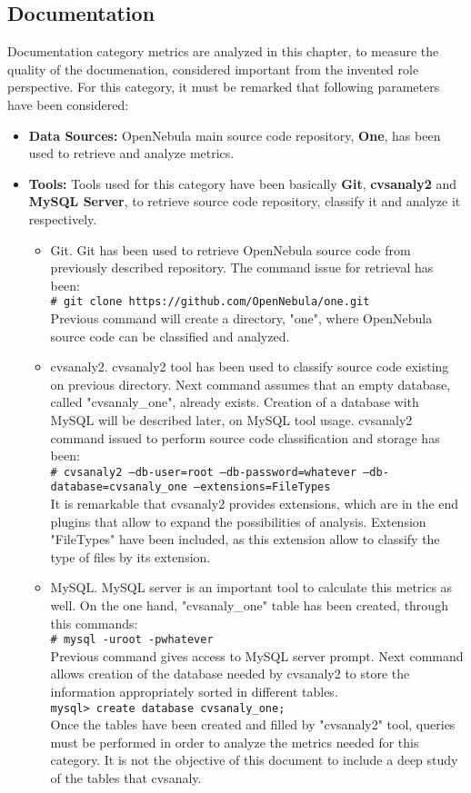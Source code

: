 \documentclass[11pt]{article}
\newcommand{\shellcmd}[1]{\\\indent\indent\texttt{\# #1}\\}
\newcommand{\mysqlcmd}[1]{\\\indent\indent\texttt{mysql> #1}\\}
\begin{document}
\subsection{Documentation}\label{sec:analysis_documentation}
Documentation category metrics are analyzed in this chapter, to measure the quality of the documenation, considered important from the invented role perspective. For this category, it must be remarked that following parameters have been considered:
\begin{itemize}\itemsep0pt
\item{\textbf{Data Sources:}} OpenNebula main source code repository, \textbf{One}, has been used to retrieve and analyze metrics. 
\item{\textbf{Tools:}} Tools used for this category have been basically \textbf{Git}, \textbf{cvsanaly2} and \textbf{MySQL Server}, to retrieve source code repository, classify it and analyze it respectively.
\begin{itemize}\itemsep0pt
\item{Git.} Git has been used to retrieve OpenNebula source code from previously described repository. The command issue for retrieval has been:
\shellcmd{git clone https://github.com/OpenNebula/one.git}
Previous command will create a directory, "one", where OpenNebula source code can be classified and analyzed.
\item{cvsanaly2.} cvsanaly2 tool has been used to classify source code existing on previous directory. Next command assumes that an empty database, called "cvsanaly\_one", already exists. Creation of a database with MySQL will be described later, on MySQL tool usage. cvsanaly2 command issued to perform source code classification and storage has been:
\shellcmd{cvsanaly2 --db-user=root --db-password=whatever --db-database=cvsanaly\_one --extensions=FileTypes}
It is remarkable that cvsanaly2 provides extensions, which are in the end plugins that allow to expand the possibilities of analysis. Extension "FileTypes" have been included, as this extension allow to classify the type of files by its extension.
\item{MySQL.} MySQL server is an important tool to calculate this metrics as well. On the one hand, "cvsanaly\_one" table has been created, through this commands:
\shellcmd{mysql -uroot -pwhatever}
Previous command gives access to MySQL server prompt. Next command allows creation of the database needed by cvsanaly2 to store the information appropriately sorted in different tables.
\mysqlcmd{create database cvsanaly\_one;}
Once the tables have been created and filled by "cvsanaly2" tool, queries must be performed in order to analyze the metrics needed for this category. It is not the objective of this document to include a deep study of the tables that cvsanaly.\\

\end{itemize}
\end{itemize}
\end{document}
